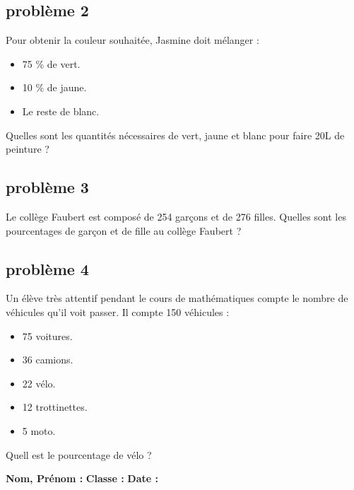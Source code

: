 \subsection*{problème 2}

Pour obtenir la couleur souhaitée, Jasmine doit mélanger : 

\begin{itemize}[label={$\bullet$}]
  \item 75 \% de vert.
  \item 10 \% de jaune.
  \item Le reste de blanc.
\end{itemize}

Quelles sont les quantités nécessaires de vert, jaune et blanc pour faire 20L de peinture  ? \\
\Pointilles[8]

\subsection*{problème 3}

Le collège Faubert est composé de 254 garçons et de 276 filles. Quelles sont les pourcentages de garçon et de fille au collège Faubert ? \\

\Pointilles[4]

\subsection*{problème 4}

Un élève très attentif pendant le cours de mathématiques compte le nombre de véhicules qu'il voit passer. Il compte 150 véhicules : 

\begin{multicols}{3}
\begin{itemize}[label={$\bullet$}]
  \item 75 voitures.
  \item 36 camions.
  \item 22 vélo.
  \item 12 trottinettes.
  \item 5 moto.
\end{itemize}
\end{multicols}

Quell est le pourcentage de vélo ? \\

\Pointilles[4]

\newpage


\textbf{Nom, Prénom :} \hspace{8cm} \textbf{Classe :} \hspace{3cm} \textbf{Date :}\\

